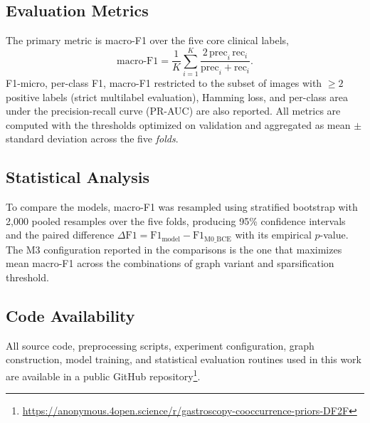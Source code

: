 \documentclass[12pt]{article}
\begin{document}

\subsection{Evaluation Metrics}

The primary metric is macro-F1 over the five core clinical labels,
\begin{equation}
\text{macro-F1} = \frac{1}{K}\sum_{i=1}^{K} \frac{2\,\text{prec}_i\,\text{rec}_i}{\text{prec}_i + \text{rec}_i}.
\end{equation}
F1-micro, per-class F1, macro-F1 restricted to the subset of images with $\geq 2$ positive labels (strict multilabel evaluation), Hamming loss, and per-class area under the precision-recall curve (PR-AUC) are also reported. All metrics are computed with the thresholds optimized on validation and aggregated as mean $\pm$ standard deviation across the five \textit{folds}.

\subsection{Statistical Analysis}

To compare the models, macro-F1 was resampled using stratified bootstrap with 2,000 pooled resamples over the five folds, producing 95\% confidence intervals and the paired difference $\Delta\text{F1} = \text{F1}_{\text{model}} - \text{F1}_{\text{M0\_BCE}}$ with its empirical $p$-value. The M3 configuration reported in the comparisons is the one that maximizes mean macro-F1 across the combinations of graph variant and sparsification threshold.

\subsection*{Code Availability}

All source code, preprocessing scripts, experiment configuration, graph construction, model training, and statistical evaluation routines used in this work are available in a public GitHub repository\footnote{\url{https://anonymous.4open.science/r/gastroscopy-cooccurrence-priors-DF2F}}.

\end{document}
